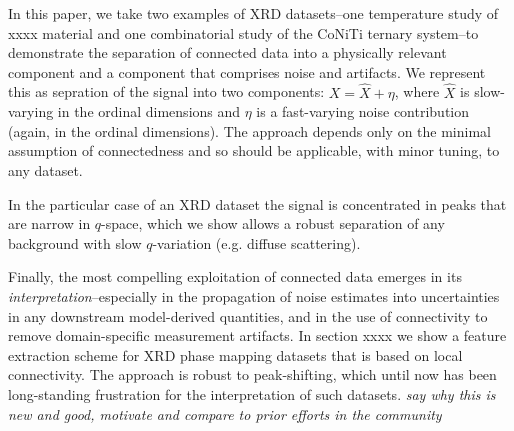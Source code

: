 \documentclass[12pt]{iopart}
\begin{document}
In this paper, we take two examples of XRD datasets--one temperature
study of xxxx material and one combinatorial study of the CoNiTi
ternary system--to demonstrate the separation of connected data into
a physically relevant component and a component that comprises
noise and artifacts. We represent this as sepration of the signal into two components: $X = \hat{X} + \eta$, where
$\hat{X}$ is slow-varying in the ordinal dimensions and $\eta$ is a fast-varying noise
contribution (again, in the ordinal dimensions). The approach depends only on the minimal assumption of
connectedness and so should be applicable, with minor tuning, to any
dataset.

In the particular case of an XRD dataset the signal is concentrated in peaks that are narrow in $q$-space, which we show allows a robust separation of any background with slow $q$-variation (e.g. diffuse scattering). 

Finally, the most compelling exploitation of connected data emerges
in its \emph{interpretation}--especially in the propagation of noise
estimates into uncertainties in any downstream model-derived quantities,
and in the use of connectivity to remove domain-specific measurement
artifacts. In section xxxx we show a feature extraction scheme for XRD
phase mapping datasets that is based on local connectivity. The approach
is robust to peak-shifting, which until now has been long-standing
frustration for the interpretation of such datasets.
\emph{say why this is new and good, motivate and compare to prior efforts in the community}


%
%
%
%
%
\end{document}
